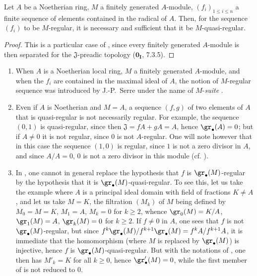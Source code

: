 \begin{corollary}[15.1.11]
\label{0.15.1.11}
Let $A$ be a Noetherian ring, $M$ a finitely generated $A$-module, $(f_i)_{1\leq i\leq n}$ a finite sequence of elements contained in the radical of $A$.
Then, for the sequence $(f_i)$ to be $M$-regular, it is necessary and sufficient that it be $M$-quasi-regular.
\end{corollary}

\begin{proof}
This is a particular case of , since every finitely generated $A$-module is then separated for the $\mathfrak{J}$-preadic topology ($\mathbf{0_I}$, 7.3.5).
\end{proof}

\begin{remarks}[15.1.12]
\label{0.15.1.12}
\mbox{}
\begin{enumerate}
  \item[(i)] When $A$ is a Noetherian local ring, $M$ a finitely generated $A$-module, and when the $f_i$ are contained in the maximal ideal of $A$, the notion of $M$-regular sequence was introduced by J.-P.~Serre under the name of $M$-\emph{suite} \cite{IV-17}.
  \item[(ii)] Even if $A$ is Noetherian and $M=A$, a sequence $(f,g)$ of two elements of $A$ that is quasi-regular is not necessarily regular.
  For example, the sequence $(0,1)$ is quasi-regular, since then $\mathfrak{J}=fA+gA=A$, hence $\gr_\bullet(A)=0$;
  but if $A\neq 0$ it is not regular, since $0$ is not $A$-regular.
  One will note however that in this case the sequence $(1,0)$ is regular, since $1$ is not a zero divisor in $A$, and since $A/A=0$, $0$ is not a zero divisor in this module (cf. ).
  \item[(iii)]
  In , one cannot in general replace the hypothesis that $f$ is $\gr_\bullet(M)$-regular by the hypothesis that it is $\gr_\bullet(M)$-quasi-regular.
  To see this, let us take the example  where $A$ is a principal ideal domain with field of fractions $K\neq A$, and let us take $M=K$, the filtration $(M_k)$ of $M$ being defined by $M_0=M=K$, $M_1=A$, $M_k=0$ for $k\geq 2$, whence $\gr_0(M)=K/A$, $\gr_1(M)=A$, $\gr_k(M)=0$ for $k\geq 2$.
  If $f\neq 0$ in $A$, one sees that $f$ is not $\gr_\bullet(M)$-regular, but since $f^k\gr_\bullet(M)/f^{k+1}\gr_\bullet(M)=f^kA/f^{k+1}A$, it is immediate that the homomorphism  (where $M$ is replaced by $\gr_\bullet(M)$) is injective, hence $f$ is $\gr_\bullet(M)$-quasi-regular.
  But with the notations of , one then has $M'_k=K$ for all $k\geq 0$, hence $\gr'_\bullet(M)=0$, while the first member of  is not reduced to $0$.
\end{enumerate}
\end{remarks}

